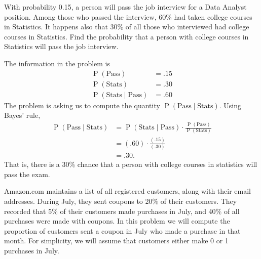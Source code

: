 \documentclass[answers,11pt]{exam}
\DeclareMathOperator*{\Prob}{P}
\renewcommand{\Pr}{\Prob}
\begin{document}
\begin{questions}
\begin{parts}

\end{parts}

\newpage

\question  With probability 0.15, a person will pass the job interview for a Data Analyst position. 
Among those who passed the interview, 60\% had taken college courses in Statistics. It
happens also that 30\% of all those who interviewed had college courses in
Statistics. Find the probability that a person with college courses in Statistics
will pass the job interview.


\begin{solution}
The information in the problem is
\begin{align*}
\Pr(\text{Pass}) &= .15 \\
\Pr(\text{Stats}) &= .30 \\
\Pr(\text{Stats} \mid \text{Pass}) &= .60
\end{align*}
The problem is asking us to compute the quantity
\(
  \Pr(\text{Pass} \mid \text{Stats}).
\)
Using Bayes' rule,
\begin{align*}
  \Pr(\text{Pass} \mid \text{Stats})
  &= \Pr(\text{Stats} \mid \text{Pass})
  \cdot \frac{\Pr(\text{Pass})}{\Pr(\text{Stats})}  \\
  &= (.60) \cdot \frac{(.15)}{(.30)} \\
  &= .30.
\end{align*}
That is, there is a 30\% chance that a person with college courses in statistics
will pass the exam.
\end{solution}


\question Amazon.com maintains a list of all registered customers, along with
their email addresses.  During July, they sent coupons to 20\% of their
customers.  They recorded that 5\% of their customers made purchases in July,
and 40\% of all purchases were made with coupons.  In this problem we will
compute the proportion of customers sent a coupon in July who made a
purchase in that month.  For simplicity, we will assume that customers either
make 0 or 1 purchases in July.


\end{questions}
\end{document}
